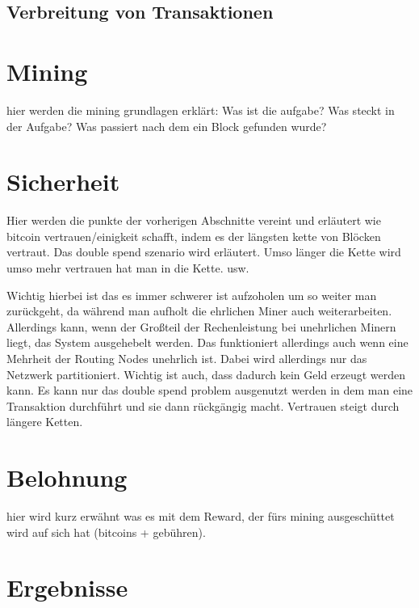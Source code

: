\documentclass[ngerman,runningheads,a4paper]{llncs}[2018/03/10]
\begin{document}
\subsection{Verbreitung von Transaktionen}\label{sec:transaktionsverbreitung}



\section{Mining}\label{sec:mining}

hier werden die mining grundlagen erklärt: Was ist die aufgabe? Was steckt in der Aufgabe? Was passiert nach dem ein Block gefunden wurde?

\section{Sicherheit}\label{sec:Sicherheit}

Hier werden die punkte der vorherigen Abschnitte vereint und erläutert wie bitcoin vertrauen/einigkeit schafft, indem es der längsten kette von Blöcken vertraut. Das double spend szenario wird erläutert. Umso länger die Kette wird umso mehr vertrauen hat man in die Kette. usw.

Wichtig hierbei ist das es immer schwerer ist aufzoholen um so weiter man zurückgeht, da während man aufholt die ehrlichen Miner auch weiterarbeiten. Allerdings kann, wenn der Großteil der Rechenleistung bei unehrlichen Minern liegt, das System ausgehebelt werden. Das funktioniert allerdings auch wenn eine Mehrheit der Routing Nodes unehrlich ist. Dabei wird allerdings nur das Netzwerk partitioniert. Wichtig ist auch, dass dadurch kein Geld erzeugt werden kann. Es kann nur das double spend problem ausgenutzt werden in dem man eine Transaktion durchführt und sie dann rückgängig macht. Vertrauen steigt durch längere Ketten.

\section{Belohnung}\label{sec:belohnung}

hier wird kurz erwähnt was es mit dem Reward, der fürs mining ausgeschüttet wird auf sich hat (bitcoins + gebühren).

\section{Ergebnisse}\label{sec:ergebnisse}
\end{document}
